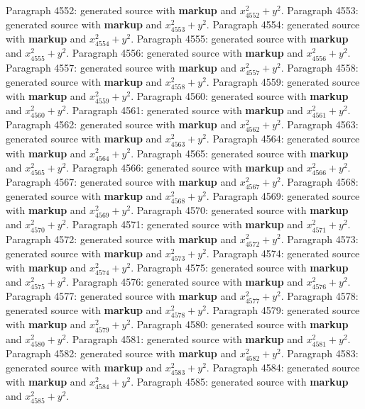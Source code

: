 \documentclass{article}
\begin{document}
Paragraph 4552: generated source with \textbf{markup} and $x_{4552}^2 + y^2$.
Paragraph 4553: generated source with \textbf{markup} and $x_{4553}^2 + y^2$.
Paragraph 4554: generated source with \textbf{markup} and $x_{4554}^2 + y^2$.
Paragraph 4555: generated source with \textbf{markup} and $x_{4555}^2 + y^2$.
Paragraph 4556: generated source with \textbf{markup} and $x_{4556}^2 + y^2$.
Paragraph 4557: generated source with \textbf{markup} and $x_{4557}^2 + y^2$.
Paragraph 4558: generated source with \textbf{markup} and $x_{4558}^2 + y^2$.
Paragraph 4559: generated source with \textbf{markup} and $x_{4559}^2 + y^2$.
Paragraph 4560: generated source with \textbf{markup} and $x_{4560}^2 + y^2$.
Paragraph 4561: generated source with \textbf{markup} and $x_{4561}^2 + y^2$.
Paragraph 4562: generated source with \textbf{markup} and $x_{4562}^2 + y^2$.
Paragraph 4563: generated source with \textbf{markup} and $x_{4563}^2 + y^2$.
Paragraph 4564: generated source with \textbf{markup} and $x_{4564}^2 + y^2$.
Paragraph 4565: generated source with \textbf{markup} and $x_{4565}^2 + y^2$.
Paragraph 4566: generated source with \textbf{markup} and $x_{4566}^2 + y^2$.
Paragraph 4567: generated source with \textbf{markup} and $x_{4567}^2 + y^2$.
Paragraph 4568: generated source with \textbf{markup} and $x_{4568}^2 + y^2$.
Paragraph 4569: generated source with \textbf{markup} and $x_{4569}^2 + y^2$.
Paragraph 4570: generated source with \textbf{markup} and $x_{4570}^2 + y^2$.
Paragraph 4571: generated source with \textbf{markup} and $x_{4571}^2 + y^2$.
Paragraph 4572: generated source with \textbf{markup} and $x_{4572}^2 + y^2$.
Paragraph 4573: generated source with \textbf{markup} and $x_{4573}^2 + y^2$.
Paragraph 4574: generated source with \textbf{markup} and $x_{4574}^2 + y^2$.
Paragraph 4575: generated source with \textbf{markup} and $x_{4575}^2 + y^2$.
Paragraph 4576: generated source with \textbf{markup} and $x_{4576}^2 + y^2$.
Paragraph 4577: generated source with \textbf{markup} and $x_{4577}^2 + y^2$.
Paragraph 4578: generated source with \textbf{markup} and $x_{4578}^2 + y^2$.
Paragraph 4579: generated source with \textbf{markup} and $x_{4579}^2 + y^2$.
Paragraph 4580: generated source with \textbf{markup} and $x_{4580}^2 + y^2$.
Paragraph 4581: generated source with \textbf{markup} and $x_{4581}^2 + y^2$.
Paragraph 4582: generated source with \textbf{markup} and $x_{4582}^2 + y^2$.
Paragraph 4583: generated source with \textbf{markup} and $x_{4583}^2 + y^2$.
Paragraph 4584: generated source with \textbf{markup} and $x_{4584}^2 + y^2$.
Paragraph 4585: generated source with \textbf{markup} and $x_{4585}^2 + y^2$.
\end{document}
